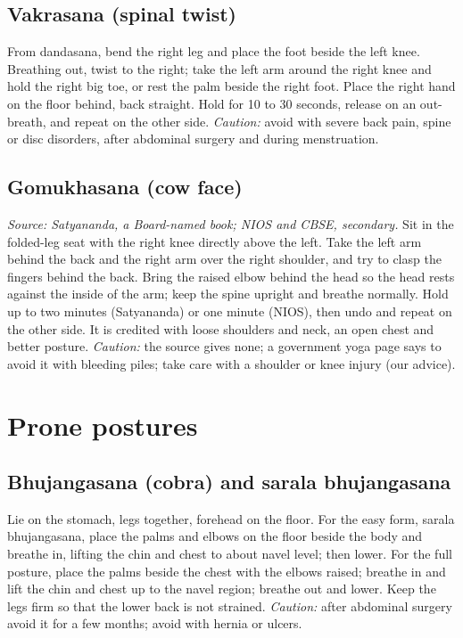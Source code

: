 \subsection*{Vakrasana (spinal twist)}
From dandasana, bend the right leg and place the foot beside the left knee. Breathing out, twist to the right; take the left arm around the right knee and hold the right big toe, or rest the palm beside the right foot. Place the right hand on the floor behind, back straight. Hold for 10 to 30 seconds, release on an out-breath, and repeat on the other side.
\textit{Caution:} avoid with severe back pain, spine or disc disorders, after abdominal surgery and during menstruation.

\subsection*{Gomukhasana (cow face)}
\textit{Source: Satyananda, a Board-named book; NIOS and CBSE, secondary.} Sit in the folded-leg seat with the right knee directly above the left. Take the left arm behind the back and the right arm over the right shoulder, and try to clasp the fingers behind the back. Bring the raised elbow behind the head so the head rests against the inside of the arm; keep the spine upright and breathe normally. Hold up to two minutes (Satyananda) or one minute (NIOS), then undo and repeat on the other side. It is credited with loose shoulders and neck, an open chest and better posture.
\textit{Caution:} the source gives none; a government yoga page says to avoid it with bleeding piles; take care with a shoulder or knee injury (our advice).

\section{Prone postures}

\subsection*{Bhujangasana (cobra) and sarala bhujangasana}
Lie on the stomach, legs together, forehead on the floor. For the easy form, sarala bhujangasana, place the palms and elbows on the floor beside the body and breathe in, lifting the chin and chest to about navel level; then lower. For the full posture, place the palms beside the chest with the elbows raised; breathe in and lift the chin and chest up to the navel region; breathe out and lower. Keep the legs firm so that the lower back is not strained.
\textit{Caution:} after abdominal surgery avoid it for a few months; avoid with hernia or ulcers.

